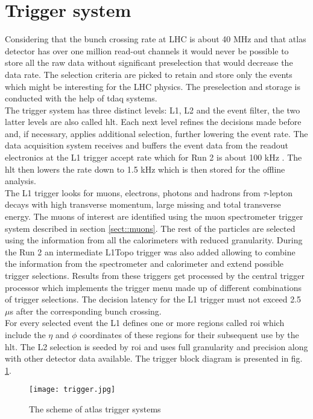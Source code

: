\section{Trigger system}
\label{sect::trigger}
 Considering that the bunch crossing rate at LHC is about 40 MHz and that \gls{atlas} detector has over one million read-out channels it would never be possible to store all the raw data without significant preselection that would decrease the data rate. The selection criteria are picked to retain and store only the events which might be interesting for the LHC physics. The preselection and storage is conducted with the help of \gls{tdaq} systems. \\
 The trigger system has three distinct levels: L1, L2 and the event filter,  the two latter levels are also called \gls{hlt}. Each next level refines the decisions made before and, if necessary, applies additional selection, further lowering the event rate. The data acquisition system receives and buffers the event data from the readout electronics at the L1 trigger accept rate which for Run 2 is about 100 kHz \cite{daq}. The \gls{hlt} then lowers the rate down to 1.5 kHz which is then stored for the offline analysis. \\
 The L1 trigger looks for muons, electrons, photons and hadrons from $\tau$-lepton decays with high transverse momentum, large missing and total transverse energy. The muons of interest are identified using the muon spectrometer trigger system described in section \ref{sect::muons}. The rest of the particles are selected using the information from all the calorimeters with reduced granularity.  During the Run 2 an intermediate L1Topo trigger was also added allowing to combine the information from the spectrometer and calorimeter and extend possible trigger selections. Results from these triggers get processed by the central trigger processor which implements the trigger menu made up of different combinations of trigger selections. The decision latency for the L1 trigger must not exceed 2.5 $\mu$s after the corresponding bunch crossing. \\
 For every selected event the L1 defines one or more regions called \gls{roi} which include the $\eta$ and $\phi$ coordinates of these regions for their subsequent use by the \gls{hlt}. The L2 selection is seeded by \gls{roi} and uses full granularity and precision along with other detector data available. The trigger block diagram is presented in fig. \ref{fig::trigger}.
    \begin{figure}[htpb]
	\texttt{[image: trigger.jpg]}
	\caption{ The scheme of \gls{atlas} trigger systems}
	\label{fig::trigger}
\end{figure}